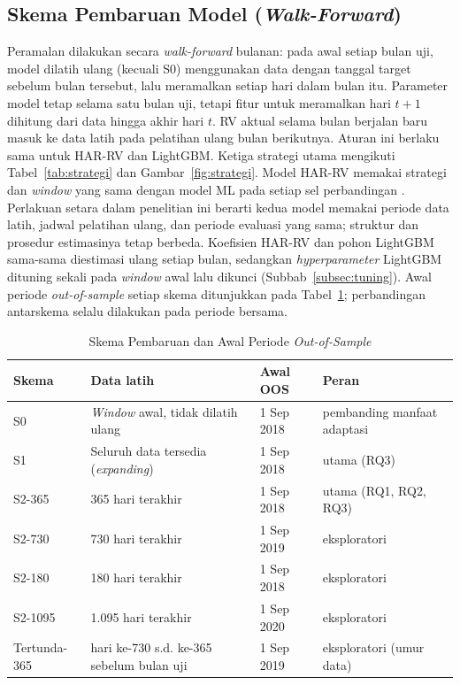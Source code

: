\subsection{Skema Pembaruan Model (\textit{Walk-Forward})}
Peramalan dilakukan secara \textit{walk-forward} bulanan: pada awal setiap
bulan uji, model dilatih ulang (kecuali S0) menggunakan data dengan tanggal
target sebelum bulan tersebut, lalu meramalkan setiap hari dalam bulan itu.
Parameter model tetap selama satu bulan uji, tetapi fitur untuk meramalkan
hari $t+1$ dihitung dari data hingga akhir hari $t$. RV aktual selama bulan
berjalan baru masuk ke data latih pada pelatihan ulang bulan berikutnya.
Aturan ini berlaku sama untuk HAR-RV dan LightGBM.
Ketiga strategi utama mengikuti Tabel~\ref{tab:strategi} dan
Gambar~\ref{fig:strategi}. Model HAR-RV memakai strategi dan \textit{window}
yang sama dengan model ML pada setiap sel perbandingan \cite{chassot2026}.
Perlakuan setara dalam penelitian ini berarti kedua model memakai periode data
latih, jadwal pelatihan ulang, dan periode evaluasi yang sama; struktur dan
prosedur estimasinya tetap berbeda. Koefisien HAR-RV dan pohon LightGBM
sama-sama diestimasi ulang setiap bulan, sedangkan \textit{hyperparameter}
LightGBM dituning sekali pada \textit{window} awal lalu dikunci
(Subbab~\ref{subsec:tuning}).
Awal periode \textit{out-of-sample} setiap skema ditunjukkan pada
Tabel~\ref{tab:oos}; perbandingan antarskema selalu dilakukan pada periode
bersama.

\begin{table}[htbp]
  \caption{Skema Pembaruan dan Awal Periode \textit{Out-of-Sample}}
  \label{tab:oos}
  \centering
  \begingroup
  \small
  \begin{tabular}{|l|p{}|l|p{}|}
    \hline
    \textbf{Skema} & \textbf{Data latih} & \textbf{Awal OOS} &
    \textbf{Peran} \\
    \hline
    S0 & \textit{Window} awal, tidak dilatih ulang & 1 Sep 2018 &
    pembanding manfaat adaptasi \\
    \hline
    S1 & Seluruh data tersedia (\textit{expanding}) & 1 Sep 2018 &
    utama (RQ3) \\
    \hline
    S2-365 & 365 hari terakhir & 1 Sep 2018 & utama (RQ1, RQ2, RQ3) \\
    \hline
    S2-730 & 730 hari terakhir & 1 Sep 2019 & eksploratori \\
    \hline
    S2-180 & 180 hari terakhir & 1 Sep 2018 & eksploratori \\
    \hline
    S2-1095 & 1.095 hari terakhir & 1 Sep 2020 & eksploratori \\
    \hline
    Tertunda-365 & hari ke-730 s.d. ke-365 sebelum bulan uji & 1 Sep 2019 &
    eksploratori (umur data) \\
    \hline
  \end{tabular}
  \endgroup
\end{table}


